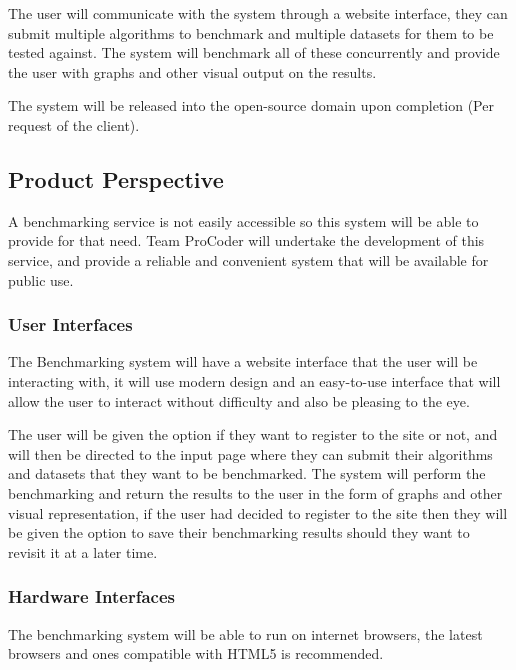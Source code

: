 \documentclass[runningheads,a4paper]{article}
\begin{document}
	The user will communicate with the system through a website interface, they can submit multiple algorithms to benchmark and multiple datasets for them to be tested against. The system will benchmark all of these concurrently and provide the user with graphs and other visual output on the results. \newline
	
	The system will be released into the open-source domain upon completion (Per request of the client). \newline

	\subsection{Product Perspective}
		A benchmarking service is not easily accessible so this system will be able to provide for that need. Team ProCoder will undertake the development of this service, and provide a reliable and convenient system that will be available for public use. \newline
		
		\subsubsection{User Interfaces}
			The Benchmarking system will have a website interface that the user will be interacting with, it will use modern design and an easy-to-use interface that will allow the user to interact without difficulty and also be pleasing to the eye. \newline
			
			The user will be given the option if they want to register to the site or not, and will then be directed to the input page where they can submit their algorithms and datasets that they want to be benchmarked. The system will perform the benchmarking and return the results to the user in the form of graphs and other visual representation, if the user had decided to register to the site then they will be given the option to save their benchmarking results should they want to revisit it at a later time. \newline
			
		\subsubsection{Hardware Interfaces}
			The benchmarking system will be able to run on internet browsers, the latest browsers and ones compatible with HTML5 is recommended. \newline
			
\end{document}
